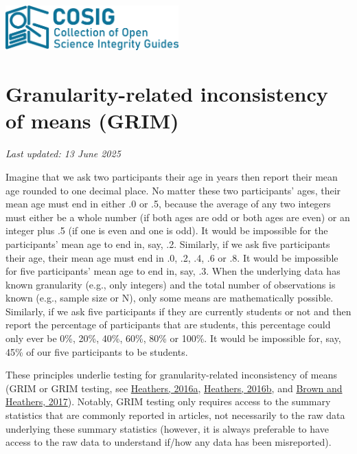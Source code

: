 \documentclass[letterpaper, 12pt]{article}
\begin{document}
\flushleft
\includegraphics[width=0.5\textwidth]{img/home/241017_final_logo_mockup.png}

\section*{Granularity-related inconsistency of means (GRIM)}
\textit{Last updated: 13 June 2025}


Imagine that we ask two participants their age in years then report their mean age rounded to one decimal place. No matter these two participants' ages, their mean age must end in either .0 or .5, because the average of any two integers must either be a whole number (if both ages are odd or both ages are even) or an integer plus .5 (if one is even and one is odd). It would be impossible for the participants' mean age to end in, say, .2. Similarly, if we ask five participants their age, their mean age must end in .0, .2, .4, .6 or .8. It would be impossible for five participants' mean age to end in, say, .3. When the underlying data has known granularity (e.g., only integers) and the total number of observations is known (e.g., sample size or N), only some means are mathematically possible. Similarly, if we ask five participants if they are currently students or not and then report the percentage of participants that are students, this percentage could only ever be 0\%, 20\%, 40\%, 60\%, 80\% or 100\%. It would be impossible for, say, 45\% of our five participants to be students.

These principles underlie testing for granularity-related inconsistency of means (GRIM or GRIM testing, see \href{https://jamesheathers.medium.com/the-grim-test-a-method-for-evaluating-published-research-9a4e5f05e870}{Heathers, 2016a}, \href{https://jamesheathers.medium.com/the-grim-test-further-points-follow-ups-and-future-directions-afd55ff67bb0#.vmgjvdvkf}{Heathers, 2016b}, and \href{https://doi.org/10.1177/1948550616673876}{Brown and Heathers, 2017}). Notably, GRIM testing only requires access to the summary statistics that are commonly reported in articles, not necessarily to the raw data underlying these summary statistics (however, it is always preferable to have access to the raw data to understand if/how any data has been misreported).
\end{document}
